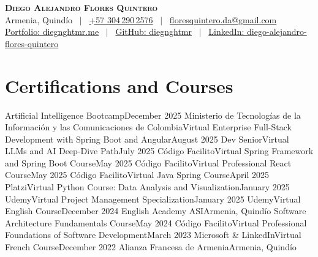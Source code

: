 \documentclass[letterpaper,12pt]{fed-res} %
\begin{document}
\begin{center}
    \textbf{\Huge \scshape Diego Alejandro Flores Quintero} \\ \vspace{1pt}
    Armenia, Quindío \ $|$ \
    \href{http://wa.me/+573042902576}{+57 304\,290\,2576} \ $|$ \
    \href{mailto:floresquintero.da@gmail.com}{floresquintero.da@gmail.com} \\[1pt]
    \href{https://www.diegnghtmr.me}{Portfolio: diegnghtmr.me} \ $|$ \
    \href{https://github.com/diegnghtmr}{GitHub: diegnghtmr} \ $|$ \
    \href{https://www.linkedin.com/in/diego-alejandro-flores-quintero/}{LinkedIn: diego-alejandro-flores-quintero}
\end{center}


\section{Certifications and Courses}
    \resumeSubHeadingListStart
        \resumeSubheading
            {Artificial Intelligence Bootcamp}{December 2025}
            {Ministerio de Tecnologías de la Información y las Comunicaciones de Colombia}{Virtual}
        \resumeSubheading
            {Enterprise Full-Stack Development with Spring Boot and Angular}{August 2025}
            {Dev Senior}{Virtual}
        \resumeSubheading
            {LLMs and AI Deep‑Dive Path}{July 2025}
            {Código Facilito}{Virtual}
        \resumeSubheading
            {Spring Framework and Spring Boot Course}{May 2025}
            {Código Facilito}{Virtual}
        \resumeSubheading
            {Professional React Course}{May 2025}
            {Código Facilito}{Virtual}
        \resumeSubheading
            {Java Spring Course}{April 2025}
            {Platzi}{Virtual}
        \resumeSubheading
            {Python Course: Data Analysis and Visualization}{January 2025}
            {Udemy}{Virtual}
        \resumeSubheading
            {Project Management Specialization}{January 2025}
            {Udemy}{Virtual}
        \resumeSubheading
            {English Course}{December 2024}
            {English Academy ASI}{Armenia, Quindío}
        \resumeSubheading
            {Software Architecture Fundamentals Course}{May 2024}
            {Código Facilito}{Virtual}
        \resumeSubheading
            {Professional Foundations of Software Development}{March 2023}
            {Microsoft \& LinkedIn}{Virtual}
        \resumeSubheading
            {French Course}{December 2022}
            {Alianza Francesa de Armenia}{Armenia, Quindío}
    \resumeSubHeadingListEnd

\end{document}

